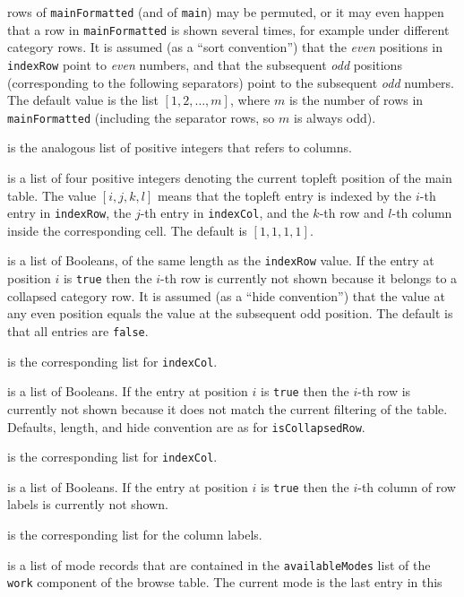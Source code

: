 \documentclass[a4paper,11pt]{report}
\begin{document}
{{{\begin{description}
rows of \texttt{mainFormatted} (and of \texttt{main}) may be permuted, or it may even happen that a row in \texttt{mainFormatted} is shown several times, for example under different category rows. It is
assumed (as a ``sort convention'')  that the \emph{even} positions in \texttt{indexRow} point to \emph{even} numbers, and that the subsequent \emph{odd} positions (corresponding to the following separators) point to the subsequent \emph{odd} numbers. The default value is the list $[ 1, 2, \ldots, m ]$, where $m$ is the number of rows in \texttt{mainFormatted} (including the separator rows, so $m$ is always odd). 
\item[{\texttt{indexCol}}]  is the analogous list of positive integers that refers to columns. 
\item[{\texttt{topleft}}]  is a list of four positive integers denoting the current topleft position of
the main table. The value $[ i, j, k, l ]$ means that the topleft entry is indexed by the $i$-th entry in \texttt{indexRow}, the $j$-th entry in \texttt{indexCol}, and the $k$-th row and $l$-th column inside the corresponding cell. The default is $[ 1, 1, 1, 1 ]$. 
\item[{\texttt{isCollapsedRow}}]  is a list of Booleans, of the same length as the \texttt{indexRow} value. If the entry at position $i$ is \texttt{true} then the $i$-th row is currently not shown because it belongs to a collapsed category row.
It is assumed (as a ``hide convention'')  that the value at any even position equals the value at the subsequent odd
position. The default is that all entries are \texttt{false}. 
\item[{\texttt{isCollapsedCol}}]  is the corresponding list for \texttt{indexCol}. 
\item[{\texttt{isRejectedRow}}]  is a list of Booleans. If the entry at position $i$ is \texttt{true} then the $i$-th row is currently not shown because it does not match the current filtering
of the table. Defaults, length, and hide convention are as for \texttt{isCollapsedRow}. 
\item[{\texttt{isRejectedCol}}]  is the corresponding list for \texttt{indexCol}. 
\item[{\texttt{isRejectedLabelsRow}}]  is a list of Booleans. If the entry at position $i$ is \texttt{true} then the $i$-th column of row labels is currently not shown. 
\item[{\texttt{isRejectedLabelsCol}}]  is the corresponding list for the column labels. 
\item[{\texttt{activeModes}}]  is a list of mode records that are contained in the \texttt{availableModes} list of the \texttt{work} component of the browse table. The current mode is the last entry in this

\end{description}}}}
\end{document}
